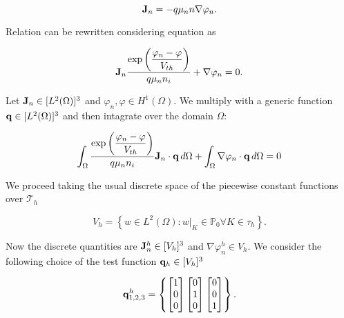 \begin{equation}
\label{eq: current density fermi}
\mathbf{J}_n=-q \mu_n n \nabla \varphi_n.
\end{equation}

Relation  can be rewritten considering equation  as

\begin{equation}
\label{eq: current density canonic form}
\mathbf{J}_n\dfrac{ \exp\left(\dfrac{\varphi_n-\varphi}{V_{th}}\right)}{q \mu_n n_i} + \nabla \varphi_n = 0.
\end{equation}

Let $\mathbf{J}_n\in[L^2(\Omega)]^3$ and $\varphi_n,\varphi \in H^1(\Omega)$. We multiply  with a generic function $\mathbf{q}\in[L^2(\Omega)]^3$ and then intagrate over the domain $\Omega$:

\begin{equation}
\label{eq: variation form of current density continuos}
\int_\Omega \dfrac{ \exp \left( \dfrac{\varphi_n-\varphi}{V_{th}} \right) }{q \mu_n n_i} \mathbf{J}_n \cdot \mathbf{q} \, d\Omega
 + \int_\Omega \nabla \varphi_n \cdot \mathbf{q} \, d\Omega = 0 
\end{equation}


We proceed taking the usual discrete space of the piecewise constant functions over $\mathcal{T}_h$

\begin{equation}
\label{eq: spaces elementwise constant}
V_h=\left\{ w \in L^2(\Omega) : w|_{K}\in \mathbb{P}_0 \forall K \in \tau_h\right\}.
\end{equation}

Now the discrete quantities are $\mathbf{J}_n^h\in[V_h]^3$ and $\nabla \varphi_n^h \in V_h$. We consider the following choice of the test function $\mathbf{q}_h \in [V_h]^3$

\begin{equation}
\label{eq: form of qh}
\mathbf{q}^h_{1,2,3} = \left\{ \begin{bmatrix} 1 \\ 0 \\ 0 \end{bmatrix}  \begin{bmatrix} 0 \\ 1 \\ 0 \end{bmatrix}  \begin{bmatrix} 0 \\ 0 \\ 1 \end{bmatrix}  \right\}.
\end{equation}

